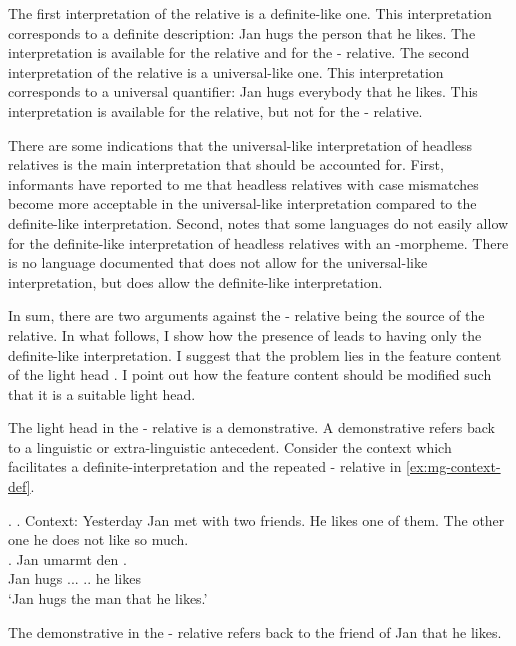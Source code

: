 The first interpretation of the  relative is a definite-like one. This interpretation corresponds to a definite description: Jan hugs the person that he likes. The interpretation is available for the  relative and for the - relative.
The second interpretation of the  relative is a universal-like one. This interpretation corresponds to a universal quantifier: Jan hugs everybody that he likes. This interpretation is available for the  relative, but not for the - relative.

There are some indications that the universal-like interpretation of headless relatives is the main interpretation that should be accounted for.
First, informants have reported to me that headless relatives with case mismatches become more acceptable in the universal-like interpretation compared to the definite-like interpretation.
Second,  notes that some languages do not easily allow for the definite-like interpretation of headless relatives with an -morpheme. There is no language documented that does not allow for the universal-like interpretation, but does allow the definite-like interpretation.

In sum, there are two arguments against the - relative being the source of the  relative. In what follows, I show how the presence of  leads to having only the definite-like interpretation. I suggest that the problem lies in the feature content of the light head . I point out how the feature content should be modified such that it is a suitable light head.

The light head in the - relative is a demonstrative. A demonstrative refers back to a linguistic or extra-linguistic antecedent. Consider the context which facilitates a definite-interpretation and the repeated - relative in \ref{ex:mg-context-def}.

\ex.
\a. Context: Yesterday Jan met with two friends. He likes one of them. The other one he does not like so much.\label{ex:mg-context-def}\\
\bg. Jan umarmt den   .\\
Jan hugs ... .. he likes\\
`Jan hugs the man that he likes.'

The demonstrative  in the - relative refers back to the friend of Jan that he likes.

